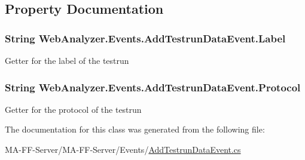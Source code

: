 \subsection{Property Documentation}
\hypertarget{class_web_analyzer_1_1_events_1_1_add_testrun_data_event_a6aab7122ffe1cd59d54c108afdc13969}{}
\subsubsection[{Label}]{\setlength{\rightskip}{0pt plus 5cm}String Web\+Analyzer.\+Events.\+Add\+Testrun\+Data\+Event.\+Label\hspace{0.3cm}{\ttfamily [get]}}\label{class_web_analyzer_1_1_events_1_1_add_testrun_data_event_a6aab7122ffe1cd59d54c108afdc13969}


Getter for the label of the testrun 

\hypertarget{class_web_analyzer_1_1_events_1_1_add_testrun_data_event_a515231faaeba712dfe83b3e8ee1a38eb}{}
\subsubsection[{Protocol}]{\setlength{\rightskip}{0pt plus 5cm}String Web\+Analyzer.\+Events.\+Add\+Testrun\+Data\+Event.\+Protocol\hspace{0.3cm}{\ttfamily [get]}}\label{class_web_analyzer_1_1_events_1_1_add_testrun_data_event_a515231faaeba712dfe83b3e8ee1a38eb}


Getter for the protocol of the testrun 



The documentation for this class was generated from the following file\+:\begin{DoxyCompactItemize}
\item 
M\+A-\/\+F\+F-\/\+Server/\+M\+A-\/\+F\+F-\/\+Server/\+Events/\hyperlink{_add_testrun_data_event_8cs}{Add\+Testrun\+Data\+Event.\+cs}\end{DoxyCompactItemize}
